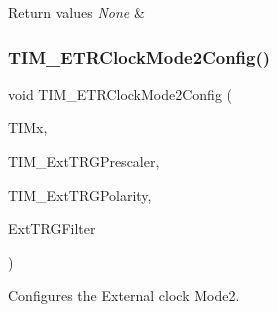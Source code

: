 \begin{DoxyRetVals}{Return values}
{\em None} & \\
\hline
\end{DoxyRetVals}
\mbox{\label{group___t_i_m___exported___functions_ga0a9cbcbab32326cbbdaf4c111f59ec20}} 
\subsubsection{\texorpdfstring{TIM\_ETRClockMode2Config()}{TIM\_ETRClockMode2Config()}}
{\footnotesize\ttfamily void T\+I\+M\+\_\+\+E\+T\+R\+Clock\+Mode2\+Config (\begin{DoxyParamCaption}\item[{\mbox{\hyperlink{struct_t_i_m___type_def}{T\+I\+M\+\_\+\+Type\+Def}} $\ast$}]{T\+I\+Mx,  }\item[{uint16\+\_\+t}]{T\+I\+M\+\_\+\+Ext\+T\+R\+G\+Prescaler,  }\item[{uint16\+\_\+t}]{T\+I\+M\+\_\+\+Ext\+T\+R\+G\+Polarity,  }\item[{uint16\+\_\+t}]{Ext\+T\+R\+G\+Filter }\end{DoxyParamCaption})}



Configures the External clock Mode2. 



